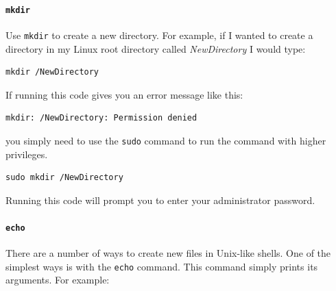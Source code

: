 \documentclass[krantz1]{krantz}
\begin{document}
\paragraph{{\tt{mkdir}}}

Use \texttt{mkdir} to create a new directory. For example, if I wanted to create a directory in my Linux root directory called {\emph{NewDirectory}} I would type:

\begin{knitrout}
\color{fgcolor}\begin{kframe}
\begin{verbatim}
mkdir /NewDirectory
\end{verbatim}
\end{kframe}
\end{knitrout}


\noindent If running this code gives you an error message like this:

\begin{knitrout}
\color{fgcolor}\begin{kframe}
\begin{verbatim}
mkdir: /NewDirectory: Permission denied
\end{verbatim}
\end{kframe}
\end{knitrout}


\noindent you simply need to use the \texttt{sudo} command to run the command with higher privileges. 

\begin{knitrout}
\color{fgcolor}\begin{kframe}
\begin{verbatim}
sudo mkdir /NewDirectory
\end{verbatim}
\end{kframe}
\end{knitrout}


\noindent Running this code will prompt you to enter your administrator password.

\paragraph{{\tt{echo}}}

There are a number of ways to create new files in Unix-like shells. One of the simplest ways is with the \texttt{echo} command. This command simply prints its arguments. For example:
\end{document}
